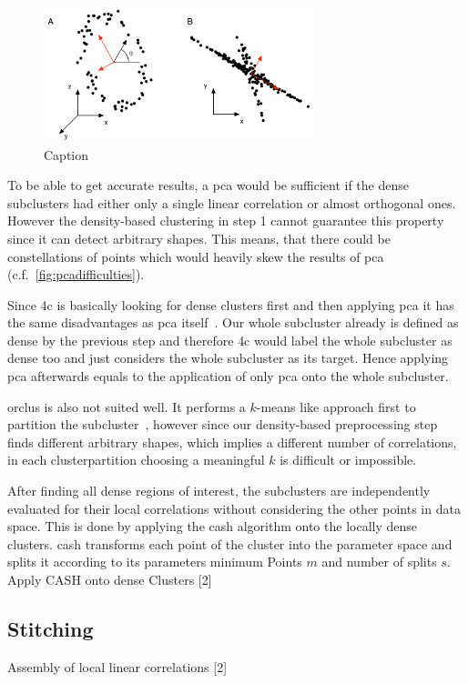 \begin{figure}
    \centering
    \includegraphics[width=0.7\textwidth]{figures/PCAdifficulties.png}
    \caption{Caption}
    \label{fig:pcadifficulties}
\end{figure}

To be able to get accurate results, a \gls{pca} would be sufficient if the dense subclusters had either only a single linear correlation or almost orthogonal ones. However the density-based clustering in step 1 cannot guarantee this property since it can detect arbitrary shapes. This means, that there could be constellations of points which would heavily skew the results of \gls{pca} (c.f.~\autoref{fig:pcadifficulties})\cite{PCAshlens2014tutorial}. 

Since \gls{4c} is basically looking for dense clusters first and then applying \gls{pca} it has the same disadvantages as \gls{pca} itself~\cite{4cbohm2004computing}. Our whole subcluster already is defined as dense by the previous step and therefore \gls{4c} would label the whole subcluster as dense too and just considers the whole subcluster as its target. Hence applying \gls{pca} afterwards equals to the application of only \gls{pca} onto the whole subcluster. 

\gls{orclus} is also not suited well. It performs a $k$-means like approach first to partition the subcluster~\cite{orclusaggarwal2000finding}, however since our density-based preprocessing step finds different arbitrary shapes, which implies a different number of correlations, in each clusterpartition choosing a meaningful $k$ is difficult or impossible. 




After finding all dense regions of interest, the subclusters are independently evaluated for their local correlations without considering the other points in data space. This is done by applying the \gls{cash} algorithm onto the locally dense clusters. \gls{cash} transforms each point of the cluster into the parameter space and splits it according to its parameters minimum Points $m$ and number of splits $s$. 
Apply CASH onto dense Clusters [2]

\subsection{Stitching}

Assembly of local linear correlations [2]